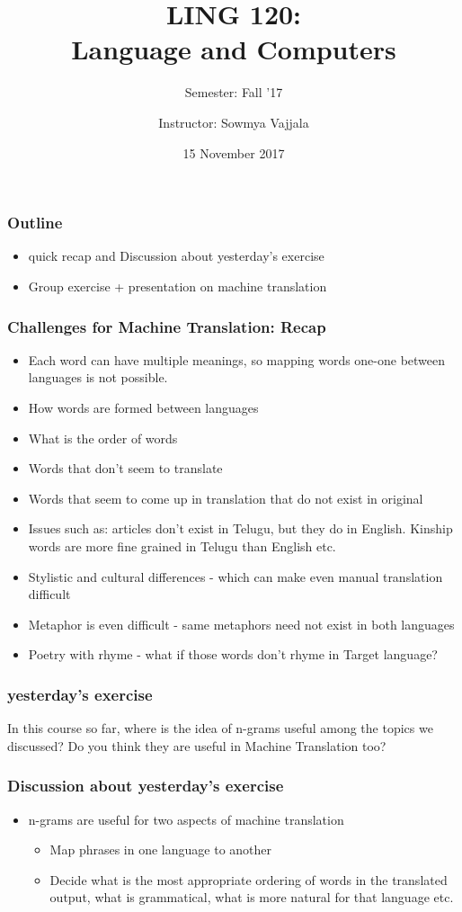 \documentclass{beamer}
\author[Sowmya Vajjala]{Instructor: Sowmya Vajjala}
\title[LING 120]{LING 120: \\ Language and Computers}
\subtitle{Semester: Fall '17}
\date{15 November 2017}
\institute{Iowa State University, USA}
\begin{document}
\begin{frame}\titlepage
\end{frame}

\begin{frame}
\frametitle{Outline}
\begin{itemize}
\item quick recap and Discussion about yesterday's exercise
\item Group exercise + presentation on machine translation
\end{itemize}
\end{frame}

\begin{frame}
\frametitle{Challenges for Machine Translation: Recap}
\begin{itemize}
\item Each word can have multiple meanings, so mapping words one-one between languages is not possible.
\item How words are formed between languages
\item What is the order of words
\item Words that don't seem to translate
\item Words that seem to come up in translation that do not exist in original
\item Issues such as: articles don't exist in Telugu, but they do in English. Kinship words are more fine grained in Telugu than English etc.
\item Stylistic and cultural differences - which can make even manual translation difficult
\item Metaphor is even difficult - same metaphors need not exist in both languages
\item Poetry with rhyme - what if those words don't rhyme in Target language?
\end{itemize}
\end{frame}

\begin{frame}
\frametitle{yesterday's exercise}
In this course so far, where is the idea of n-grams useful among the topics we discussed? Do you think they are useful in Machine Translation too? 
\end{frame}

\begin{frame}
\frametitle{Discussion about yesterday's exercise}
\begin{itemize}
\item n-grams are useful for two aspects of machine translation
\begin{itemize}
\item Map phrases in one language to another
\item Decide what is the most appropriate ordering of words in the translated output, what is grammatical, what is more natural for that language etc. 
\end{itemize}
\end{itemize}
\end{frame}
\end{document}
